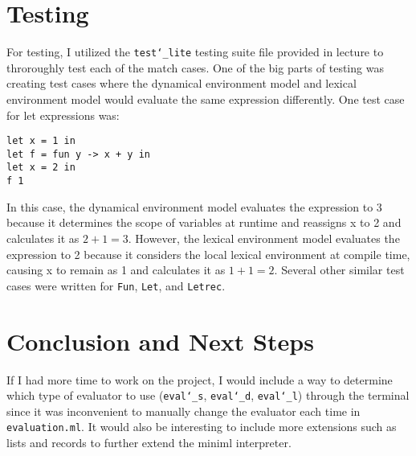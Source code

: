 \documentclass{article}
\begin{document}
\section{Testing}

For testing, I utilized the \texttt{test\char`_lite} testing suite file provided in lecture to throroughly test each of the match cases. 
One of the big parts of testing was creating test cases where the dynamical environment model and lexical environment model would evaluate the same expression differently. 
One test case for let expressions was:

\begin{lstlisting}
let x = 1 in 
let f = fun y -> x + y in 
let x = 2 in 
f 1 
\end{lstlisting}

In this case, the dynamical environment model evaluates the expression to 3 because it determines the scope of variables at runtime and reassigns x to 2 and calculates it as $2 + 1 = 3$.
However, the lexical environment model evaluates the expression to 2 because it considers the local lexical environment at compile time, causing x to remain as 1 and calculates it as $1 + 1 = 2$.
Several other similar test cases were written for \texttt{Fun}, \texttt{Let}, and \texttt{Letrec}.

\section{Conclusion and Next Steps}

If I had more time to work on the project, I would include a way to determine which type of evaluator to use (\texttt{eval\char`_s}, \texttt{eval\char`_d}, \texttt{eval\char`_l}) through the terminal since 
it was inconvenient to manually change the evaluator each time in \texttt{evaluation.ml}. It would also be interesting to include more extensions such as lists and records to further extend the miniml interpreter.
\end{document}
